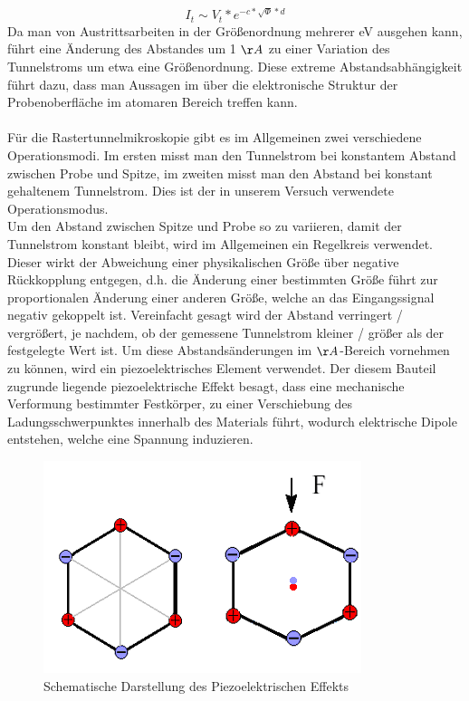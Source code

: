 \documentclass[10pt,a4paper]{article}
\begin{document}
	\begin{equation}
		I_{t} \sim V_{t} * e^{-c*\sqrt{\Phi }*d}
	\end{equation}
	Da man von Austrittsarbeiten in der Größenordnung mehrerer eV ausgehen kann, führt eine Änderung des Abstandes um 1 $\AA$ zu einer Variation des Tunnelstroms um etwa eine Größenordnung. Diese extreme Abstandsabhängigkeit führt dazu, dass man Aussagen im über die elektronische Struktur der Probenoberfläche im atomaren Bereich treffen kann. \\ \\Für die Rastertunnelmikroskopie gibt es im Allgemeinen zwei verschiedene Operationsmodi. Im ersten misst man den Tunnelstrom bei konstantem Abstand zwischen Probe und Spitze, im zweiten misst man den Abstand bei konstant gehaltenem Tunnelstrom. Dies ist der in unserem Versuch verwendete Operationsmodus. \\Um den Abstand zwischen Spitze und Probe so zu variieren, damit der Tunnelstrom konstant bleibt, wird im Allgemeinen ein Regelkreis verwendet. Dieser wirkt der Abweichung einer physikalischen Größe über negative Rückkopplung entgegen, d.h. die Änderung einer bestimmten Größe führt zur proportionalen Änderung einer anderen Größe, welche an das Eingangssignal negativ gekoppelt ist. Vereinfacht gesagt wird der Abstand verringert / vergrößert, je nachdem, ob der gemessene Tunnelstrom  kleiner / größer als der festgelegte Wert ist. Um diese Abstandsänderungen im $\AA$-Bereich vornehmen zu können, wird ein piezoelektrisches Element verwendet. Der diesem Bauteil zugrunde liegende piezoelektrische Effekt besagt, dass eine mechanische Verformung bestimmter Festkörper, zu einer Verschiebung des Ladungsschwerpunktes innerhalb des Materials führt, wodurch elektrische Dipole entstehen, welche eine Spannung induzieren.
	\begin{figure}[h]
		\includegraphics[scale = 1]{1piezo.png}
		\centering
		\caption{Schematische Darstellung des Piezoelektrischen Effekts}
		\label{diagramm_aufspaltung}
	\end{figure}
\end{document}
